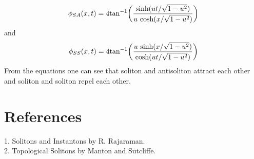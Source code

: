 \documentclass[a4paper, 12pt]{article}
\begin{document}
 \begin{equation}%
 \phi_{SA}(x,t) = 4\textrm{tan}^{-1}\bigg(\frac{\textrm{sinh}(ut/\sqrt{1-u^2})}{u\*\ \textrm{cosh}(x/\sqrt{1-u^2})}\bigg)
 \end{equation}
 and
  \begin{equation}%
 \phi_{SS}(x,t) = 4\textrm{tan}^{-1}\bigg(\frac{u\*\ \textrm{sinh}(x/\sqrt{1-u^2})}{\textrm{cosh}(ut/\sqrt{1-u^2})}\bigg)
 \end{equation}
 From the equations one can see that soliton and antisoliton attract each other and soliton and soliton repel each other.


  \section {References}
1. Solitons and Instantons by R. Rajaraman.\\
2. Topological Solitons by Manton and Sutcliffe.
\end{document}
